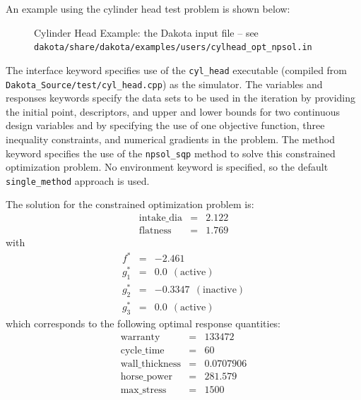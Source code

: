 An example using the cylinder head test problem is shown below:
\begin{figure}[ht!]
  \centering
  \begin{small}
    \begin{bigbox}
    \end{bigbox}
  \end{small}
  \caption{Cylinder Head Example: the Dakota input file --
see \texttt{dakota/share/dakota/examples/users/cylhead\_opt\_npsol.in} }
  \label{additional:cylinder_head}
\end{figure}

The interface keyword specifies use of the \texttt{cyl\_head}
executable (compiled from \texttt{Dakota\_Source/test/cyl\_head.cpp}) as the
simulator. The variables and responses keywords specify the data sets
to be used in the iteration by providing the initial point,
descriptors, and upper and lower bounds for two continuous design
variables and by specifying the use of one objective function, three
inequality constraints, and numerical gradients in the problem. The
method keyword specifies the use of the \texttt{npsol\_sqp} method to
solve this constrained optimization problem. No environment keyword is
specified, so the default \texttt{single\_method} approach is used.

The solution for the constrained optimization problem is:
\begin{eqnarray*}
    \mathrm{intake\_dia} &=& 2.122 \\
    \mathrm{flatness}    &=& 1.769
\end{eqnarray*}
with
\begin{eqnarray*}
      f^{\ast} &=& -2.461 \\
    g_1^{\ast} &=&  0.0    ~~\mathrm{(active)} \\
    g_2^{\ast} &=& -0.3347 ~~\mathrm{(inactive)} \\
    g_3^{\ast} &=&  0.0    ~~\mathrm{(active)}
\end{eqnarray*}
which corresponds to the following optimal response quantities:
\begin{eqnarray*}
    \mathrm{warranty}        &=& 133472 \\
    \mathrm{cycle\_time}     &=& 60 \\
    \mathrm{wall\_thickness} &=& 0.0707906 \\
    \mathrm{horse\_power}    &=& 281.579 \\
    \mathrm{max\_stress}     &=& 1500
\end{eqnarray*}

